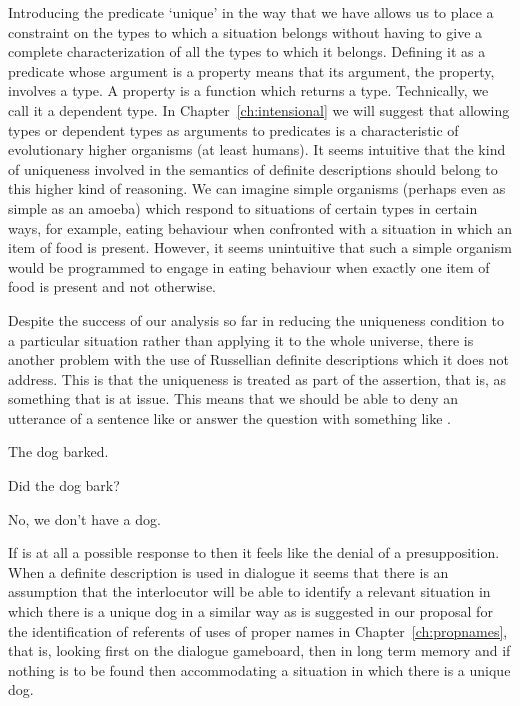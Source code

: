 Introducing the predicate `unique' in the way that we have allows us
to place a constraint on the types to which a situation belongs
without having to give a complete characterization of all the types to
which it belongs.  Defining it as a predicate whose argument is a
property means that its argument, the
property, involves a type.  A property is a function which returns a type.
Technically, we call it a dependent type.  In
Chapter~\ref{ch:intensional} we will suggest that allowing types or
dependent types as arguments to predicates is a characteristic of
evolutionary higher organisms (at least humans).  It seems intuitive that the kind of
uniqueness involved in the semantics of definite descriptions should
belong to this higher kind of reasoning.  We can imagine simple
organisms (perhaps even as simple as an amoeba) which respond to situations of certain types in certain
ways, for example, eating  behaviour when confronted with a situation in which an item of food is present.
However, it seems unintuitive that such a simple organism would be
programmed to engage in eating behaviour when exactly one item of food
is present and not otherwise.

Despite the success of our analysis so far in reducing the uniqueness
condition to a particular situation rather than applying it to the
whole universe, there is another problem with the use of Russellian
definite descriptions which it does not address.  This is that the
uniqueness is treated as part of the assertion, that is, as something
that is at issue.   This means that we should be able to deny an
utterance of a sentence like  or answer the question
 with something like
.
\begin{ex} 
\begin{subex} 
 
\item The dog barked.
  
\item Did the dog bark?
 
\item No, we don't have a dog. 
 
\end{subex} 
   
\end{ex}
If  is at all a possible response to  then it
feels like the denial of a presupposition.  When a definite
description is used in dialogue it seems that there is an assumption
that the interlocutor will be able to identify a relevant situation
in which there is a unique dog in a similar way as is suggested in our proposal for
the identification of referents of uses of proper names in
Chapter~\ref{ch:propnames}, that is, looking first on the dialogue
gameboard, then in long term memory and if nothing is to be found then
accommodating a situation in which there is a unique dog.
  
